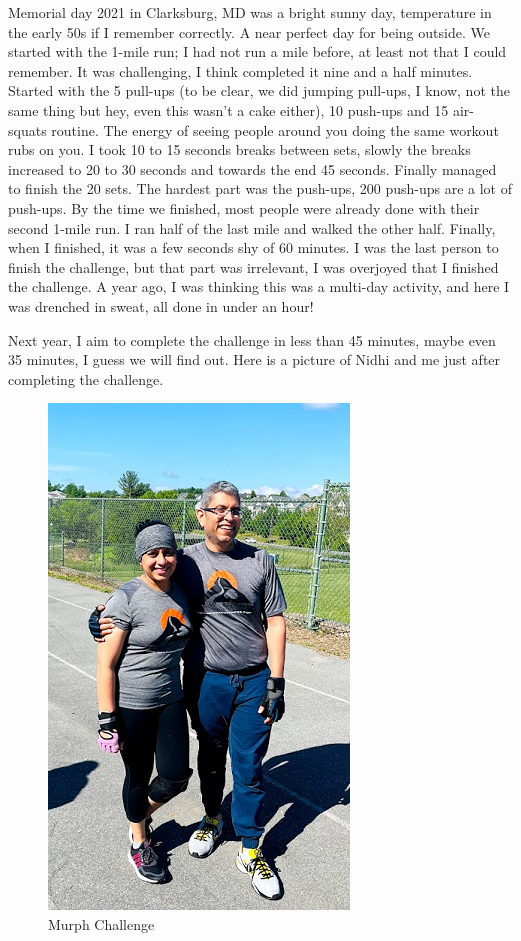 \documentclass[
  oneside]{book}
\begin{document}
Memorial day 2021 in Clarksburg, MD was a bright sunny day, temperature in the early 50s if I remember correctly. A near perfect day for being outside. We started with the 1-mile run; I had not run a mile before, at least not that I could remember. It was challenging, I think completed it nine and a half minutes. Started with the 5 pull-ups (to be clear, we did jumping pull-ups, I know, not the same thing but hey, even this wasn't a cake either), 10 push-ups and 15 air-squats routine. The energy of seeing people around you doing the same workout rubs on you. I took 10 to 15 seconds breaks between sets, slowly the breaks increased to 20 to 30 seconds and towards the end 45 seconds. Finally managed to finish the 20 sets. The hardest part was the push-ups, 200 push-ups are a lot of push-ups. By the time we finished, most people were already done with their second 1-mile run. I ran half of the last mile and walked the other half. Finally, when I finished, it was a few seconds shy of 60 minutes. I was the last person to finish the challenge, but that part was irrelevant, I was overjoyed that I finished the challenge. A year ago, I was thinking this was a multi-day activity, and here I was drenched in sweat, all done in under an hour!

Next year, I aim to complete the challenge in less than 45 minutes, maybe even 35 minutes, I guess we will find out. Here is a picture of Nidhi and me just after completing the challenge.

\begin{figure}
\centering
\includegraphics{pictures/murph.png}
\caption{Murph Challenge}
\end{figure}
\end{document}
